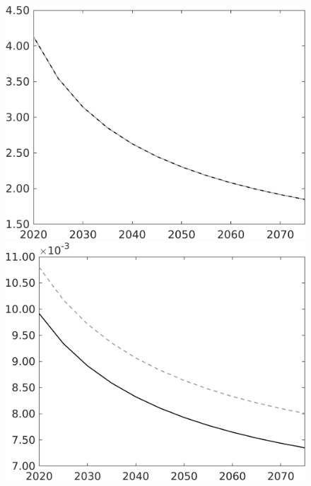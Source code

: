 \documentclass[12pt]{article}
\begin{document}
\begin{figure}[h!!]
\begin{minipage}[]{0.32\textwidth}
	\end{minipage}	
	\begin{minipage}[]{0.32\textwidth}
		\includegraphics[width=1\textwidth]{../../codding_model/own_basedOnFried/optimalPol_010922_revision/figures/all_13Sept22/CompTaul_Equlab_LFBAU_Reg0_pgpftf_spillover0_nsk1_xgr0_knspil0_sep1_countec0_GovRev0_etaa0.79_lgd0.png}
	\end{minipage}		
	\begin{minipage}[]{0.32\textwidth}
		\includegraphics[width=1\textwidth]{../../codding_model/own_basedOnFried/optimalPol_010922_revision/figures/all_13Sept22/CompTaul_Equlab_LFBAU_Reg0_Lf_spillover0_nsk1_xgr0_knspil0_sep1_countec0_GovRev0_etaa0.79_lgd0.png}

\end{minipage}
\end{figure}
\end{document}
